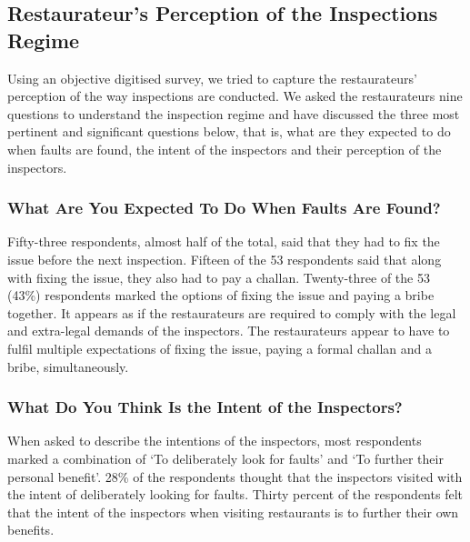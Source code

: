 \documentclass[a4paper, 12pt]{article}
\begin{document}
		\subsection{Restaurateur’s Perception of the Inspections Regime}
		Using an objective digitised survey, we tried to capture the restaurateurs’ perception of the way inspections are conducted. We asked the restaurateurs nine questions to understand the inspection regime and have discussed the three most pertinent and 
significant questions below, that is, what are they expected to do when faults are found, the intent of the inspectors and their perception of the inspectors.
		
		\subsubsection {What Are You Expected To Do When Faults Are Found?}
		Fifty-three respondents, almost half of the total, said that they had to fix the issue before the next inspection. Fifteen of the 53 respondents said that along with fixing the issue, they also had to pay a challan. Twenty-three of the 53 (43\%) respondents 
marked the options of fixing the issue and paying a bribe together. It appears as if the restaurateurs are required to comply with the legal and extra-legal demands of the inspectors. The restaurateurs appear to have to fulfil multiple expectations of fixing the issue, 
paying a formal challan and a bribe, simultaneously.

		
		\subsubsection {What Do You Think Is the Intent of the Inspectors?}
		
		When asked to describe the intentions of the inspectors, most respondents marked a combination of ‘To deliberately look for faults’ and ‘To further their personal benefit’. 28\% of the respondents thought that the inspectors visited with the intent of 
deliberately looking for faults. Thirty percent of the respondents felt that the intent of the inspectors when visiting restaurants is to further their own benefits.
		
\end{document}
